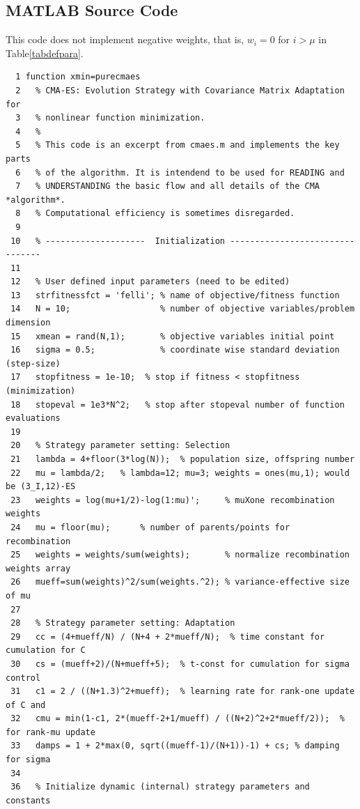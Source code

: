 \documentclass{article} %
\newcommand{\nref}[1]{\nolinebreak[4]\hspace{0.2845em plus0.05em minus0.17em}\nolinebreak[4]\ref{#1}}
\begin{document}
\begin{appendix}
\section{\textsc{MATLAB} Source Code\label{sec:source}}
This code does not implement negative weights, that is, $w_i=0$ for $i>\mu$ in Table\nref{tabdefpara}. 
\begin{scriptsize}
\begin{verbatim}
  1 function xmin=purecmaes
  2   % CMA-ES: Evolution Strategy with Covariance Matrix Adaptation for
  3   % nonlinear function minimization. 
  4   %
  5   % This code is an excerpt from cmaes.m and implements the key parts
  6   % of the algorithm. It is intendend to be used for READING and
  7   % UNDERSTANDING the basic flow and all details of the CMA *algorithm*. 
  8   % Computational efficiency is sometimes disregarded. 
  9 
 10   % --------------------  Initialization --------------------------------  
 11 
 12   % User defined input parameters (need to be edited)
 13   strfitnessfct = 'felli'; % name of objective/fitness function
 14   N = 10;                  % number of objective variables/problem dimension
 15   xmean = rand(N,1);       % objective variables initial point
 16   sigma = 0.5;             % coordinate wise standard deviation (step-size)
 17   stopfitness = 1e-10;  % stop if fitness < stopfitness (minimization)
 18   stopeval = 1e3*N^2;   % stop after stopeval number of function evaluations
 19   
 20   % Strategy parameter setting: Selection  
 21   lambda = 4+floor(3*log(N));  % population size, offspring number
 22   mu = lambda/2;   % lambda=12; mu=3; weights = ones(mu,1); would be (3_I,12)-ES
 23   weights = log(mu+1/2)-log(1:mu)';     % muXone recombination weights
 24   mu = floor(mu);      % number of parents/points for recombination
 25   weights = weights/sum(weights);       % normalize recombination weights array
 26   mueff=sum(weights)^2/sum(weights.^2); % variance-effective size of mu
 27 
 28   % Strategy parameter setting: Adaptation
 29   cc = (4+mueff/N) / (N+4 + 2*mueff/N);  % time constant for cumulation for C
 30   cs = (mueff+2)/(N+mueff+5);  % t-const for cumulation for sigma control
 31   c1 = 2 / ((N+1.3)^2+mueff);  % learning rate for rank-one update of C and
 32   cmu = min(1-c1, 2*(mueff-2+1/mueff) / ((N+2)^2+2*mueff/2));  % for rank-mu update
 33   damps = 1 + 2*max(0, sqrt((mueff-1)/(N+1))-1) + cs; % damping for sigma 
 34   
 36   % Initialize dynamic (internal) strategy parameters and constants

\end{verbatim}
\end{scriptsize}
\end{appendix}
\end{document}
